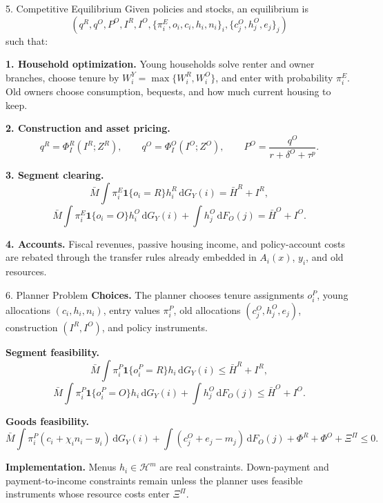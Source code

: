 \documentclass[11pt,aspectratio=169]{beamer}
\newcommand{\dd}{\mathrm d}
\newcommand{\1}{\mathbf 1}
\newcommand{\HH}{\mathcal H}
\newcommand{\Mbar}{\bar M}
\begin{document}
\begin{frame}{5. Competitive Equilibrium}
\footnotesize
Given policies and stocks, an equilibrium is
\[
\left(q^R,q^O,P^O,I^R,I^O,\{\pi_i^E,o_i,c_i,h_i,n_i\}_i,\{c_j^O,h_j^O,e_j\}_j\right)
\]
such that:

\smallskip
\textbf{1. Household optimization.}
Young households solve renter and owner branches, choose tenure by \(W_i^Y=\max\{W_i^R,W_i^O\}\), and enter with probability \(\pi_i^E\). Old owners choose consumption, bequests, and how much current housing to keep.

\smallskip
\textbf{2. Construction and asset pricing.}
\[
q^R=\Phi_I^R(I^R;Z^R),\qquad
q^O=\Phi_I^O(I^O;Z^O),\qquad
P^O=\frac{q^O}{r+\delta^O+\tau^p}.
\]

\smallskip
\textbf{3. Segment clearing.}
\[
\Mbar\int \pi_i^E\1\{o_i=R\}h_i^R\,\dd G_Y(i)=\bar H^R+I^R,
\]
\[
\Mbar\int \pi_i^E\1\{o_i=O\}h_i^O\,\dd G_Y(i)+\int h_j^O\,\dd F_O(j)=\bar H^O+I^O.
\]

\smallskip
\textbf{4. Accounts.}
Fiscal revenues, passive housing income, and policy-account costs are rebated through the transfer rules already embedded in \(A_i(x)\), \(y_i\), and old resources.
\end{frame}

\begin{frame}{6. Planner Problem}
\footnotesize
\textbf{Choices.}
The planner chooses tenure assignments \(o_i^P\), young allocations \((c_i,h_i,n_i)\), entry values \(\pi_i^P\), old allocations \((c_j^O,h_j^O,e_j)\), construction \((I^R,I^O)\), and policy instruments.

\smallskip
\textbf{Segment feasibility.}
\[
\Mbar\int \pi_i^P\1\{o_i^P=R\}h_i\,\dd G_Y(i)\le \bar H^R+I^R,
\]
\[
\Mbar\int \pi_i^P\1\{o_i^P=O\}h_i\,\dd G_Y(i)+\int h_j^O\,\dd F_O(j)\le \bar H^O+I^O.
\]

\smallskip
\textbf{Goods feasibility.}
\[
\Mbar\int \pi_i^P(c_i+\chi_i n_i-y_i)\,\dd G_Y(i)
+\int(c_j^O+e_j-m_j)\,\dd F_O(j)
+\Phi^R+\Phi^O+\Xi^\Pi\le0.
\]

\smallskip
\textbf{Implementation.}
Menus \(h_i\in\HH^m\) are real constraints. Down-payment and payment-to-income constraints remain unless the planner uses feasible instruments whose resource costs enter \(\Xi^\Pi\).
\end{frame}
\end{document}
